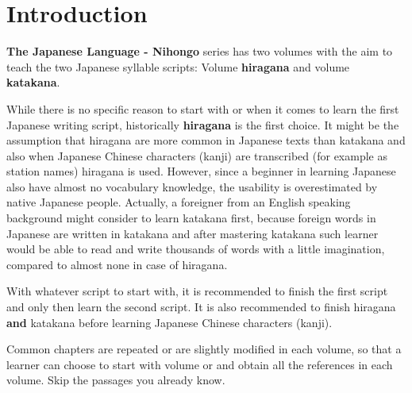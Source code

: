 \chapter*{Introduction}
\label{chap:Introduction}

\textbf{The Japanese Language - Nihongo} series has two volumes with the aim to
teach the two Japanese syllable scripts: Volume  \textbf{hiragana}
and volume  \textbf{katakana}.%
%
%

While there is no specific reason to start with \jtopic or \jtopicopposite when
it comes to learn the first Japanese writing script, historically
\textbf{hiragana} is the first choice. It might be the assumption that hiragana
are more common in Japanese texts than katakana and also when Japanese Chinese
characters (kanji) are transcribed (for example as station names) hiragana is
used. However, since a beginner in learning Japanese also have almost no
vocabulary knowledge, the usability is overestimated by native Japanese people.
Actually, a foreigner from an English speaking background might consider to
learn katakana first, because foreign words in Japanese are written in katakana
and after mastering katakana such learner would be able to read and write
thousands of words with a little imagination, compared to almost none in case
of hiragana.  

With whatever script to start with, it is recommended to finish the first
script and only then learn the second script. It is also recommended to finish
hiragana \textbf{and} katakana before learning Japanese Chinese characters
(kanji).

Common chapters are repeated or are slightly modified in each volume, so that a
learner can choose to start with volume {} or {} and
obtain all the references in each volume. Skip the passages you already know.




